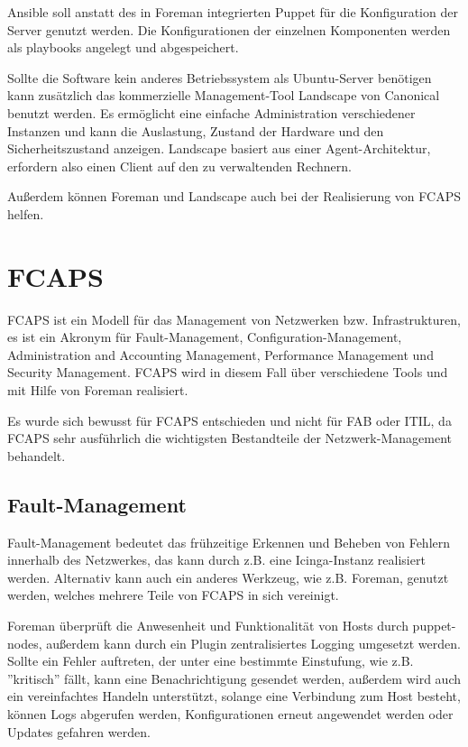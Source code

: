 Ansible soll anstatt des in Foreman integrierten Puppet für die Konfiguration der Server genutzt werden. Die Konfigurationen der einzelnen Komponenten werden als playbooks angelegt und abgespeichert.

Sollte die Software kein anderes Betriebssystem als Ubuntu-Server benötigen kann zusätzlich das kommerzielle Management-Tool Landscape von Canonical benutzt werden. Es ermöglicht eine einfache Administration verschiedener Instanzen und kann die Auslastung, Zustand der Hardware und den Sicherheitszustand anzeigen. Landscape basiert aus einer Agent-Architektur, erfordern also einen Client auf den zu verwaltenden Rechnern.

Außerdem können Foreman und Landscape auch bei der Realisierung von FCAPS helfen.

\section{FCAPS}
FCAPS ist ein Modell für das Management von Netzwerken bzw. Infrastrukturen, es ist ein Akronym für Fault-Management, Configuration-Management, Administration and Accounting Management, Performance Management und Security Management. FCAPS wird in diesem Fall über verschiedene Tools und mit Hilfe von Foreman realisiert.

Es wurde sich bewusst für FCAPS entschieden und nicht für FAB oder ITIL, da FCAPS sehr ausführlich die wichtigsten Bestandteile der Netzwerk-Management behandelt.


\subsection{Fault-Management}
Fault-Management bedeutet das frühzeitige Erkennen und Beheben von Fehlern innerhalb des Netzwerkes, das kann durch z.B. eine Icinga-Instanz realisiert werden. Alternativ kann auch ein anderes Werkzeug, wie z.B. Foreman, genutzt werden, welches mehrere Teile von FCAPS in sich vereinigt.

Foreman überprüft die Anwesenheit und Funktionalität von Hosts durch puppet-nodes, außerdem kann durch ein Plugin zentralisiertes Logging umgesetzt werden. Sollte ein Fehler auftreten, der unter eine bestimmte Einstufung, wie z.B. ''kritisch'' fällt, kann eine Benachrichtigung gesendet werden, außerdem wird auch ein vereinfachtes Handeln unterstützt, solange eine Verbindung zum Host besteht, können Logs abgerufen werden, Konfigurationen erneut angewendet werden oder Updates gefahren werden.

